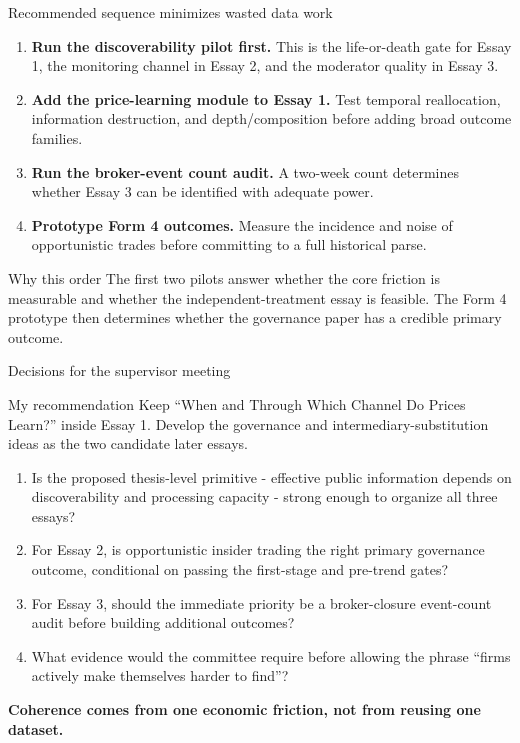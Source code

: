 \documentclass[aspectratio=169,10pt]{beamer}
\newcommand{\key}[1]{\textcolor{MadridBlue}{\textbf{#1}}}
\begin{document}
\begin{frame}[t]{Recommended sequence minimizes wasted data work}
\begin{enumerate}
  \item \key{Run the discoverability pilot first.} This is the life-or-death gate for Essay 1, the monitoring channel in Essay 2, and the moderator quality in Essay 3.
  \item \key{Add the price-learning module to Essay 1.} Test temporal reallocation, information destruction, and depth/composition before adding broad outcome families.
  \item \key{Run the broker-event count audit.} A two-week count determines whether Essay 3 can be identified with adequate power.
  \item \key{Prototype Form 4 outcomes.} Measure the incidence and noise of opportunistic trades before committing to a full historical parse.
\end{enumerate}

\vspace{0.18cm}
\begin{alertblock}{Why this order}
The first two pilots answer whether the core friction is measurable and whether the independent-treatment essay is feasible. The Form 4 prototype then determines whether the governance paper has a credible primary outcome.
\end{alertblock}
\end{frame}

\begin{frame}[t]{Decisions for the supervisor meeting}
\begin{block}{My recommendation}
\large
Keep ``When and Through Which Channel Do Prices Learn?'' inside Essay 1. Develop the governance and intermediary-substitution ideas as the two candidate later essays.
\end{block}

\vspace{0.12cm}
\begin{enumerate}
  \item Is the proposed thesis-level primitive - effective public information depends on discoverability and processing capacity - strong enough to organize all three essays?
  \item For Essay 2, is opportunistic insider trading the right primary governance outcome, conditional on passing the first-stage and pre-trend gates?
  \item For Essay 3, should the immediate priority be a broker-closure event-count audit before building additional outcomes?
  \item What evidence would the committee require before allowing the phrase ``firms actively make themselves harder to find''?
\end{enumerate}

\vfill
\centering
\large\textcolor{MadridBlue}{\textbf{Coherence comes from one economic friction, not from reusing one dataset.}}
\end{frame}
\end{document}
